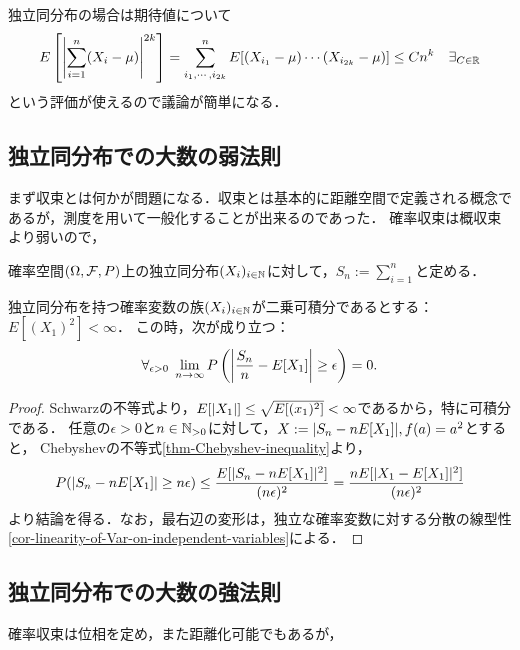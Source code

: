 \documentclass[uplatex,dvipdfmx]{jsreport}
\begin{document}
独立同分布の場合は期待値について
\[E\left[\left|\sum^n_{i=1}(X_i-\mu)\right|^{2k}\right]=\sum^n_{i_1,\cdots,i_{2k}}E[(X_{i_1}-\mu)\cdots(X_{i_{2k}}-\mu)]\le Cn^k\quad\exists_{C\in\mathbb{R}}\]
という評価が使えるので議論が簡単になる．

\subsection{独立同分布での大数の弱法則}

\begin{tcolorbox}[colframe=ForestGreen, colback=ForestGreen!10!white,breakable,colbacktitle=ForestGreen!40!white,coltitle=black,fonttitle=\bfseries\sffamily,
title=]
    まず収束とは何かが問題になる．収束とは基本的に距離空間で定義される概念であるが，測度を用いて一般化することが出来るのであった．
    確率収束は概収束より弱いので，
\end{tcolorbox}

\begin{notation}
    確率空間$(\Omega,\mathcal{F},P)$上の独立同分布$(X_i)_{i\in\mathbb{N}}$に対して，$S_n:=\sum_{i=1}^n$と定める．
\end{notation}

\begin{theorem}\label{thm-weak-law-of-large-numbers}
    独立同分布を持つ確率変数の族$(X_i)_{i\in\mathbb{N}}$が二乗可積分であるとする：$E[(X_1)^2]<\infty$．
    この時，次が成り立つ：
    \[\forall_{\epsilon>0}\;\lim_{n\to\infty}P\left(\left|\frac{S_n}{n}-E[X_1]\right|\ge\epsilon\right)=0.\]
\end{theorem}
\begin{proof}
    Schwarzの不等式より，$E[\lvert X_1\rvert]\le\sqrt{E[(x_1)^2]}<\infty$であるから，特に可積分である．
    任意の$\epsilon>0$と$n\in\mathbb{N}_{>0}$に対して，$X:=\lvert S_n-nE[X_1]\rvert,f(a)=a^2$とすると，
    Chebyshevの不等式\ref{thm-Chebyshev-inequality}より，
    \[P(\lvert S_n-nE[X_1]\rvert\ge n\epsilon)\le\frac{E[\lvert S_n-nE[X_1]\rvert^2]}{(n\epsilon)^2}=\frac{nE[\lvert X_1-E[X_1]\rvert^2]}{(n\epsilon)^2}\]
    より結論を得る．なお，最右辺の変形は，独立な確率変数に対する分散の線型性\ref{cor-linearity-of-Var-on-independent-variables}による．
\end{proof}

\subsection{独立同分布での大数の強法則}

\begin{tcolorbox}[colframe=ForestGreen, colback=ForestGreen!10!white,breakable,colbacktitle=ForestGreen!40!white,coltitle=black,fonttitle=\bfseries\sffamily,
title=]
    確率収束は位相を定め，また距離化可能でもあるが，
\end{tcolorbox}
\end{document}
